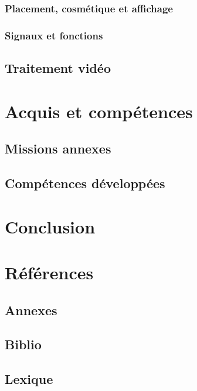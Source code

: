 \documentclass[11pt, french]{report}
\begin{document}
        \subsubsection{Placement, cosmétique et affichage}
        \subsubsection{Signaux et fonctions}
    \subsection{Traitement vidéo}

\section{Acquis et compétences}
    \subsection{Missions annexes}
    \subsection{Compétences développées}

\section{Conclusion}

\section{Références}
    \subsection{Annexes}
    \subsection{Biblio}
    \subsection{Lexique}
\end{document}
